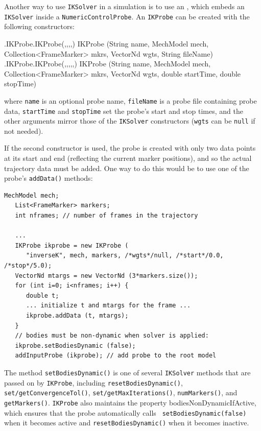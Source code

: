Another way to use {\tt IKSolver} in a simulation is to use an
, which embeds an {\tt IKSolver}
inside a\pdfbreak 
{\tt NumericControlProbe}. An {\tt IKProbe} can be created with the
following constructors:
%
\begin{methodtable}{0.9}{0.1}
%
\methodentry
{\probes.IKProbe.IKProbe(,,,,)}%
{IKProbe (String name, MechModel mech, Collection<FrameMarker> mkrs,\brh
VectorNd wgts, String fileName)}%
{\ }%
%
\methodentry
{\probes.IKProbe.IKProbe(,,,,,)}%
{IKProbe (String name, MechModel mech, Collection<FrameMarker> mkrs,\brh
VectorNd wgts, double startTime, double stopTime)}%
{\ }%
%
\end{methodtable}
%
where {\tt name} is an optional probe name, {\tt fileName} is a probe file
containing probe data, {\tt startTime} and {\tt stopTime} set the probe's start
and stop times, and the other arguments mirror those of the {\tt IKSolver}
constructors ({\tt wgts} can be {\tt null} if not needed).

If the second constructor is used, the probe is created with only two data
points at its start and end (reflecting the current marker positions), and so
the actual trajectory data must be added. One way to do this would be to use
one of the probe's {\tt addData()} methods:
%
\begin{lstlisting}[]
   MechModel mech;
   List<FrameMarker> markers;
   int nframes; // number of frames in the trajectory

   ...
   IKProbe ikprobe = new IKProbe (
      "inverseK", mech, markers, /*wgts*/null, /*start*/0.0, /*stop*/5.0);
   VectorNd mtargs = new VectorNd (3*markers.size());
   for (int i=0; i<nframes; i++) {
      double t;
      ... initialize t and mtargs for the frame ...
      ikprobe.addData (t, mtargs);
   }
   // bodies must be non-dynamic when solver is applied:
   ikprobe.setBodiesDynamic (false);
   addInputProbe (ikprobe); // add probe to the root model
\end{lstlisting}
%
The method {\tt setBodiesDynamic()} is one of several {\tt IKSolver} methods
that are passed on by {\tt IKProbe}, including {\tt resetBodiesDynamic()}, {\tt
set/getConvergenceTol()}, {\tt set/getMaxIterations()}, {\tt numMarkers()}, and
{\tt getMarkers()}. {\tt IKProbe} also maintains the property {\sf
bodiesNonDynamicIfActive}, which ensures that the probe automatically calls {\tt
setBodiesDynamic(false)} when it becomes active and {\tt resetBodiesDynamic()}
when it becomes inactive.


